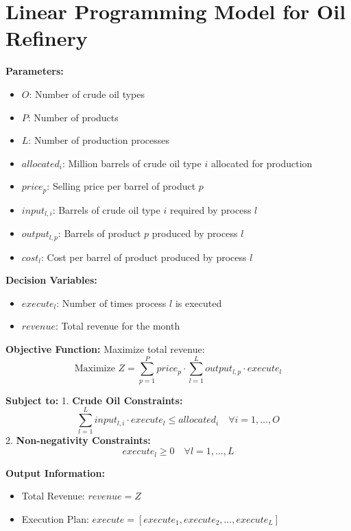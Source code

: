\documentclass{article}
\begin{document}
\section*{Linear Programming Model for Oil Refinery}

\textbf{Parameters:}
\begin{itemize}
    \item $O$: Number of crude oil types
    \item $P$: Number of products
    \item $L$: Number of production processes
    \item $allocated_i$: Million barrels of crude oil type $i$ allocated for production
    \item $price_p$: Selling price per barrel of product $p$
    \item $input_{l,i}$: Barrels of crude oil type $i$ required by process $l$
    \item $output_{l,p}$: Barrels of product $p$ produced by process $l$
    \item $cost_l$: Cost per barrel of product produced by process $l$
\end{itemize}

\textbf{Decision Variables:}
\begin{itemize}
    \item $execute_l$: Number of times process $l$ is executed
    \item $revenue$: Total revenue for the month
\end{itemize}

\textbf{Objective Function:}
Maximize total revenue:
\[
\text{Maximize } Z = \sum_{p=1}^{P} price_p \cdot \sum_{l=1}^{L} output_{l,p} \cdot execute_l
\]

\textbf{Subject to:}
1. \textbf{Crude Oil Constraints:}
\[
\sum_{l=1}^{L} input_{l,i} \cdot execute_l \leq allocated_i \quad \forall i = 1, \ldots, O
\]
2. \textbf{Non-negativity Constraints:}
\[
execute_l \geq 0 \quad \forall l = 1, \ldots, L
\]

\textbf{Output Information:}
\begin{itemize}
    \item Total Revenue: $revenue = Z$
    \item Execution Plan: $execute = [execute_1, execute_2, \ldots, execute_L]$
\end{itemize}
\end{document}
